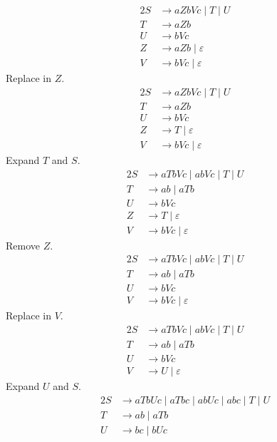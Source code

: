 \documentclass[docid=PA09]{tcom_PA}
\begin{document}
\setcounter{chapter}{8}
{
\renewcommand{\thesubsubsection}{\thesubsection\alph{subsubsection}}
\begin{alignat*}{2}
	S &\rightarrow aZbVc\mid T\mid U\\
	T &\rightarrow aZb\\
	U &\rightarrow bVc\\
	Z &\rightarrow aZb\mid \varepsilon \\
	V &\rightarrow bVc\mid \varepsilon
\end{alignat*}
Replace in $Z$.
\begin{alignat*}{2}
	S &\rightarrow aZbVc\mid T\mid U\\
	T &\rightarrow aZb\\
	U &\rightarrow bVc\\
	Z &\rightarrow T\mid \varepsilon \\
	V &\rightarrow bVc\mid \varepsilon
\end{alignat*}
Expand $T$ and $S$.
\begin{alignat*}{2}
	S &\rightarrow aTbVc\mid abVc\mid T\mid U\\
	T &\rightarrow ab\mid aTb\\
	U &\rightarrow bVc\\
	Z &\rightarrow T\mid \varepsilon \\
	V &\rightarrow bVc\mid \varepsilon
\end{alignat*}
Remove $Z$.
\begin{alignat*}{2}
	S &\rightarrow aTbVc\mid abVc\mid T\mid U\\
	T &\rightarrow ab\mid aTb\\
	U &\rightarrow bVc\\
	V &\rightarrow bVc\mid \varepsilon
\end{alignat*}
Replace in $V$.
\begin{alignat*}{2}
	S &\rightarrow aTbVc\mid abVc\mid T\mid U\\
	T &\rightarrow ab\mid aTb\\
	U &\rightarrow bVc\\
	V &\rightarrow U\mid \varepsilon
\end{alignat*}
Expand $U$ and $S$.
\begin{alignat*}{2}
	S &\rightarrow aTbUc\mid aTbc\mid abUc\mid abc\mid T\mid U\\
	T &\rightarrow ab\mid aTb\\
	U &\rightarrow bc\mid bUc\\

\end{alignat*}}
\end{document}
